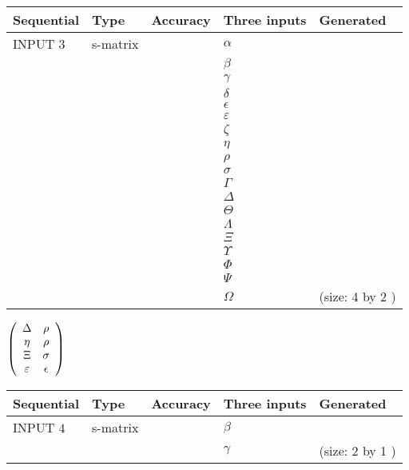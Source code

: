 \documentclass[12pt]{article}
\begin{document}
  
\noindent\begin{tabular}{|l|l|l|l|l|}
\hline
 Sequential & Type & Accuracy & Three inputs & Generated \\ 
\hline
 
 
  INPUT $            3 $ & s-matrix & & 
 $  \alpha $ & 
  \\
  & & & 
 $  \beta $ & 
  \\
  & & & 
 $  \gamma $ & 
  \\
  & & & 
 $  \delta $ & 
  \\
  & & & 
 $  \epsilon $ & 
  \\
  & & & 
 $  \varepsilon $ & 
  \\
  & & & 
 $                     \zeta $ & 
  \\
  & & & 
 $  \eta $ & 
  \\
  & & & 
 $  \rho $ & 
  \\
  & & & 
 $  \sigma $ & 
  \\
  & & & 
 $  \Gamma $ & 
  \\
  & & & 
 $  \Delta $ & 
  \\
  & & & 
 $  \Theta $ & 
  \\
  & & & 
 $  \Lambda $ & 
  \\
  & & & 
 $                     \Xi $ & 
  \\
  & & & 
 $  \Upsilon $ & 
  \\
  & & & 
 $  \Phi $ & 
  \\
  & & & 
 $  \Psi $ & 
  \\
  & & & 
 $  \Omega $ & 
  (size:            4  by            2 )
 \\  \hline  
 \end{tabular}
   
   
 $  \left( \begin{array}
 {
 c
 c
 }
 \Delta & 
 \rho \\ 
 \eta & 
 \rho \\ 
                    \Xi & 
 \sigma \\ 
 \varepsilon & 
 \epsilon
 \end{array} \right) $ 
  
  
\noindent\begin{tabular}{|l|l|l|l|l|}
\hline
 Sequential & Type & Accuracy & Three inputs & Generated \\ 
\hline
 
 
  INPUT $            4 $ & s-matrix & & 
 $  \beta $ & 
  \\
  & & & 
 $  \gamma $ & 
  (size:            2  by            1 )
 \\  \hline  
 \end{tabular}
   
\end{document}
